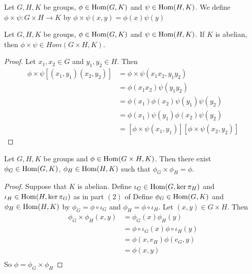 \documentclass{book}
\begin{document}
	\begin{defn}
		Let $G,H, K$ be groups, $\phi \in \operatorname{Hom}(G,K)$ and $\psi \in \operatorname{Hom}(H, K)$. We define $\phi \times \psi: G \times H \rightarrow K$ by $\phi \times \psi(x,y) = \phi(x) \psi(y)$ 
	\end{defn}	
	
	\begin{ex}
		 Let $G,H, K$ be groups, $\phi \in \operatorname{Hom}(G,K)$ and $\psi \in \operatorname{Hom}(H, K)$. If $K$ is abelian, then $\phi \times \psi \in Hom(G \times H,K)$.
	\end{ex}
	
	\begin{proof}
		Let $x_1, x_2 \in G$ and $y_1, y_2 \in H$. Then 
		\begin{align*}
			\phi \times \psi[(x_1, y_1)(x_2, y_2)] 
			&= \phi \times \psi (x_1x_2, y_1y_2) \\
			&= \phi(x_1x_2) \psi(y_1y_2) \\
			&= \phi(x_1)\phi(x_2)\psi(y_1)\psi(y_2) \\
			&= \phi(x_1)\psi(y_1)\phi(x_2)\psi(y_2) \\
			&= [\phi \times \psi(x_1, y_1)] [\phi \times \psi(x_2, y_2) ]
		\end{align*}
	\end{proof}
	
	\begin{ex}
		 Let $G,H, K$ be groups and $\phi \in \operatorname{Hom}(G \times H, K)$. Then there exist $\phi_G \in \operatorname{Hom}(G,K)$, $\phi_H \in \operatorname{Hom}(H, K)$ such that $\phi_G \times \phi_H = \phi$.
	\end{ex}
	
	\begin{proof}
		Suppose that $K$ is abelian. Define $\iota_G \in \operatorname{Hom}(G, \ker \pi_H)$ and $\iota_H \in \operatorname{Hom}(H, \ker \pi_G)$ as in part $(2)$ of  Define $\phi_G \in \operatorname{Hom}(G, K)$ and $\phi_H \in \operatorname{Hom}(H,K)$ by  $\phi_G = \phi \circ \iota_G$ and $\phi_H = \phi \circ \iota_H $. Let $(x,y) \in G \times H$. Then 
		\begin{align*}
			\phi_G \times \phi_H(x,y) 
			&= \phi_G(x) \phi_H(y) \\
			&= \phi \circ \iota_G(x) \phi \circ \iota_H(y) \\
			&= \phi(x, e_H)\phi(e_G, y) \\
			&= \phi(x,y) \\
		\end{align*}
		So $\phi = \phi_G \times \phi_H$
	\end{proof}
	
\end{document}
